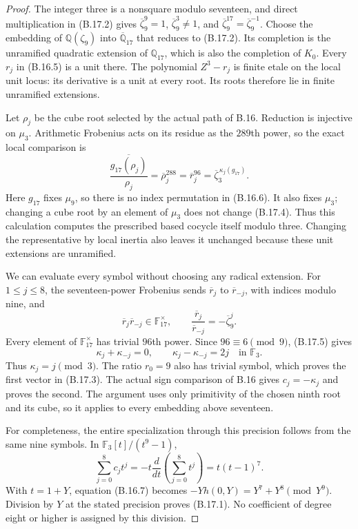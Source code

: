\begin{proof}
The integer three is a nonsquare modulo seventeen, and
direct multiplication in (B.17.2) gives
$\overline\zeta_9^9=1$,
$\overline\zeta_9^3\ne1$, and
$\overline\zeta_9^{17}=\overline\zeta_9^{-1}$.
Choose the embedding of $\mathbb Q(\zeta_9)$ into
$\overline{\mathbb Q}_{17}$ that reduces to (B.17.2).
Its completion is the unramified quadratic extension
of $\mathbb Q_{17}$, which is also the completion of
$K_0$. Every $r_j$ in (B.16.5) is a unit there.
The polynomial $Z^3-r_j$ is finite etale on the local
unit locus: its derivative is a unit at every root.
Its roots therefore lie in finite unramified extensions.

Let $\rho_j$ be the cube root selected by the actual
path of B.16. Reduction is injective on $\mu_3$.
Arithmetic Frobenius acts on its residue as the
$289$th power, so the exact local comparison is
\[
 \overline{\frac{g_{17}(\rho_j)}{\rho_j}}
    =\overline\rho_j^{288}
    =\overline r_j^{96}
    =\overline\zeta_3^{\,\kappa_j(g_{17})}.
                                                               \tag{B.17.4}
\]
Here $g_{17}$ fixes $\mu_9$, so there is no index
permutation in (B.16.6). It also fixes $\mu_3$;
changing a cube root by an element of $\mu_3$ does
not change (B.17.4). Thus this calculation computes
the prescribed based cocycle itself modulo three.
Changing the representative by local inertia also
leaves it unchanged because these unit extensions
are unramified.

We can evaluate every symbol without choosing any
radical extension. For $1\leq j\leq8$, the
seventeen-power Frobenius sends $\overline r_j$ to
$\overline r_{-j}$, with indices modulo nine, and
\[
 \overline r_j\overline r_{-j}\in\mathbb F_{17}^{\times},
 \qquad
 \frac{\overline r_j}{\overline r_{-j}}
     =-\overline\zeta_9^j.
                                                               \tag{B.17.5}
\]
Every element of $\mathbb F_{17}^{\times}$ has
trivial $96$th power. Since $96\equiv6\pmod9$,
(B.17.5) gives
\[
 \kappa_j+\kappa_{-j}=0,
 \qquad \kappa_j-\kappa_{-j}=2j
       \quad\text{in }\mathbb F_3.
\]
Thus $\kappa_j=j\pmod3$. The ratio $r_0=9$
also has trivial symbol, which proves the first
vector in (B.17.3). The actual sign comparison of
B.16 gives $c_j=-\kappa_j$ and proves the second.
The argument uses only primitivity of the chosen
ninth root and its cube, so it applies to every
embedding above seventeen.

For completeness, the entire specialization through
this precision follows from the same nine symbols.
In $\mathbb F_3[t]/(t^9-1)$,
\[
 \sum_{j=0}^8c_jt^j
   =-t\frac{d}{dt}\left(\sum_{j=0}^8t^j\right)
   =t(t-1)^7.
\]
With $t=1+Y$, equation (B.16.7) becomes
$-Yh(0,Y)=Y^7+Y^8\pmod{Y^9}$.
Division by $Y$ at the stated precision proves
(B.17.1). No coefficient of degree eight or higher
is assigned by this division.


\end{proof}
